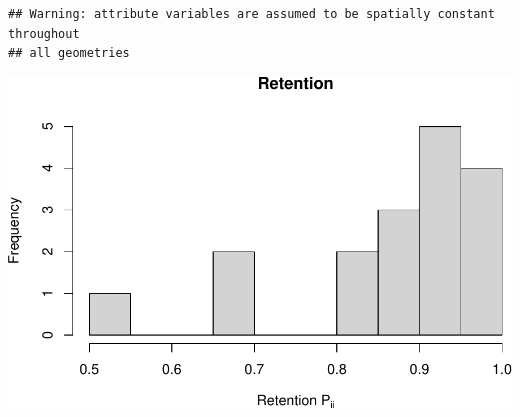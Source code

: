 \documentclass[
]{article}
\begin{document}
\begin{verbatim}
## Warning: attribute variables are assumed to be spatially constant throughout
## all geometries
\end{verbatim}

\includegraphics{habmodel_files/figure-latex/unnamed-chunk-2-1.pdf}
\end{document}
